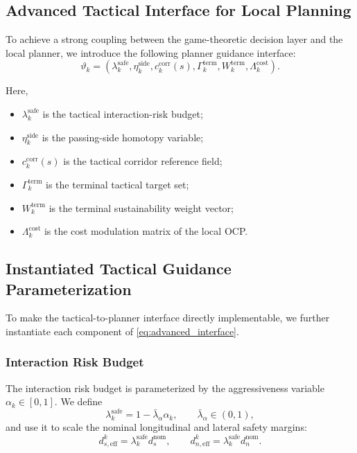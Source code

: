\documentclass[final ,3p, times]{elsarticle}
\begin{document}
\subsection{Advanced Tactical Interface for Local Planning}
\label{subsec:advanced_tactical_interface}

To achieve a strong coupling between the game-theoretic decision layer and the local planner, we introduce the following planner guidance interface:
\begin{equation}
\vartheta_k
=
\left(
\lambda_k^{\mathrm{safe}},
\eta_k^{\mathrm{side}},
c_k^{\mathrm{corr}}(s),
\Gamma_k^{\mathrm{term}},
W_k^{\mathrm{term}},
\Lambda_k^{\mathrm{cost}}
\right).
\label{eq:advanced_interface}
\end{equation}

Here,
\begin{itemize}
    \item $\lambda_k^{\mathrm{safe}}$ is the tactical interaction-risk budget;
    \item $\eta_k^{\mathrm{side}}$ is the passing-side homotopy variable;
    \item $c_k^{\mathrm{corr}}(s)$ is the tactical corridor reference field;
    \item $\Gamma_k^{\mathrm{term}}$ is the terminal tactical target set;
    \item $W_k^{\mathrm{term}}$ is the terminal sustainability weight vector;
    \item $\Lambda_k^{\mathrm{cost}}$ is the cost modulation matrix of the local OCP.
\end{itemize}

\subsection{Instantiated Tactical Guidance Parameterization}
\label{subsec:instantiated_tactical_guidance}

To make the tactical-to-planner interface directly implementable, we further instantiate each component of \eqref{eq:advanced_interface}.

\subsubsection{Interaction Risk Budget}

The interaction risk budget is parameterized by the aggressiveness variable $\alpha_k\in[0,1]$. We define
\begin{equation}
\lambda_k^{\mathrm{safe}} = 1-\bar\lambda_\alpha \alpha_k,
\qquad
\bar\lambda_\alpha \in (0,1),
\label{eq:safe_budget_affine}
\end{equation}
and use it to scale the nominal longitudinal and lateral safety margins:
\begin{equation}
d_{s,\mathrm{eff}}^k
=
\lambda_k^{\mathrm{safe}} d_s^{\mathrm{nom}},
\qquad
d_{n,\mathrm{eff}}^k
=
\lambda_k^{\mathrm{safe}} d_n^{\mathrm{nom}}.
\label{eq:safe_budget_scaled}
\end{equation}
\end{document}
